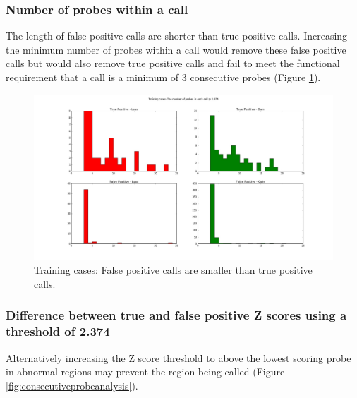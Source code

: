 \subsubsection{Number of probes within a call}
The length of false positive calls are shorter than true positive calls. Increasing the minimum number of probes within a call would remove these false positive calls but would also remove true positive calls and fail to meet the functional requirement that a call is a minimum of 3 consecutive probes (Figure \ref{fig:nprobes_2_374}).

\begin{figure}[h]
\centering
\includegraphics[width=\linewidth]{./Figures/nprobes_2_374}
\caption{Training cases: False positive calls are smaller than true positive calls.}
\label{fig:nprobes_2_374}
\end{figure}

\subsubsection{Difference between true and false positive Z scores using a threshold of 2.374}
Alternatively increasing the Z score threshold to above the lowest scoring probe in abnormal regions may prevent the region being called (Figure \ref{fig:consecutiveprobeanalysis}).
